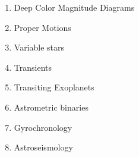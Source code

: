 \begin{enumerate}

\item Deep Color Magnitude Diagrams


\item Proper Motions


\item Variable stars


\item Transients

\item Transiting Exoplanets

\item Astrometric binaries

\item Gyrochronology

\item Astroseismology

\end{enumerate}

